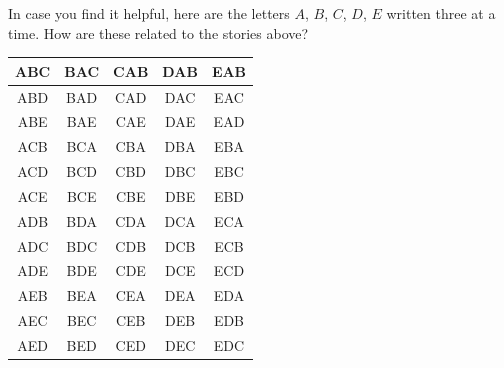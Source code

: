 \documentclass[nooutcomes, noauthor]{ximera}
\begin{document}
\newpage

In case you find it helpful, here are the letters $A$, $B$, $C$, $D$, $E$ written three at a time. How are these related to the stories above?
\huge \begin{center}
\begin{tabular} {|c|c|c|c|c|} \hline
ABC & BAC & CAB & DAB & EAB \\ \hline
ABD & BAD & CAD & DAC & EAC \\ \hline
ABE & BAE & CAE & DAE & EAD \\ \hline
ACB & BCA & CBA & DBA & EBA \\ \hline
ACD & BCD & CBD & DBC & EBC \\ \hline
ACE & BCE & CBE & DBE & EBD \\ \hline
ADB & BDA & CDA & DCA & ECA \\ \hline
ADC & BDC & CDB & DCB & ECB \\ \hline
ADE & BDE & CDE & DCE & ECD \\ \hline
AEB & BEA & CEA & DEA & EDA \\ \hline
AEC & BEC & CEB & DEB & EDB \\ \hline
AED & BED & CED & DEC & EDC \\ \hline

 \end{tabular}
\end{center} \rm

\newpage
\normalsize
\end{document}
